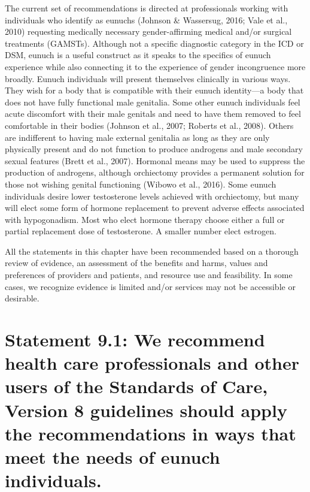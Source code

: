 \documentclass[
]{book}
\begin{document}
The current set of recommendations is directed
at professionals working with individuals who
identify as eunuchs (Johnson \& Wassersug, 2016;
Vale et al., 2010) requesting medically necessary
gender-affirming medical and/or surgical treatments (GAMSTs). Although not a specific diagnostic category in the ICD or DSM, eunuch is a
useful construct as it speaks to the specifics of
eunuch experience while also connecting it to
the experience of gender incongruence more
broadly. Eunuch individuals will present themselves clinically in various ways. They wish for
a body that is compatible with their eunuch identity---a body that does not have fully functional
male genitalia. Some other eunuch individuals
feel acute discomfort with their male genitals and
need to have them removed to feel comfortable
in their bodies (Johnson et al., 2007; Roberts
et al., 2008). Others are indifferent to having
male external genitalia as long as they are only
physically present and do not function to produce
androgens and male secondary sexual features
(Brett et al., 2007). Hormonal means may be used
to suppress the production of androgens, although
orchiectomy provides a permanent solution for
those not wishing genital functioning (Wibowo
et al., 2016). Some eunuch individuals desire
lower testosterone levels achieved with orchiectomy, but many will elect some form of hormone
replacement to prevent adverse effects associated
with hypogonadism. Most who elect hormone
therapy choose either a full or partial replacement
dose of testosterone. A smaller number elect
estrogen.

All the statements in this chapter have been
recommended based on a thorough review of
evidence, an assessment of the benefits and
harms, values and preferences of providers and
patients, and resource use and feasibility. In some
cases, we recognize evidence is limited and/or
services may not be accessible or desirable.

\hypertarget{statement-9.1-we-recommend-health-care-professionals-and-other-users-of-the-standards-of-care-version-8-guidelines-should-apply-the-recommendations-in-ways-that-meet-the-needs-of-eunuch-individuals.}{%
\section*{Statement 9.1: We recommend health care professionals and other users of the Standards of Care, Version 8 guidelines should apply the recommendations in ways that meet the needs of eunuch individuals.}\label{statement-9.1-we-recommend-health-care-professionals-and-other-users-of-the-standards-of-care-version-8-guidelines-should-apply-the-recommendations-in-ways-that-meet-the-needs-of-eunuch-individuals.}}
\end{document}
